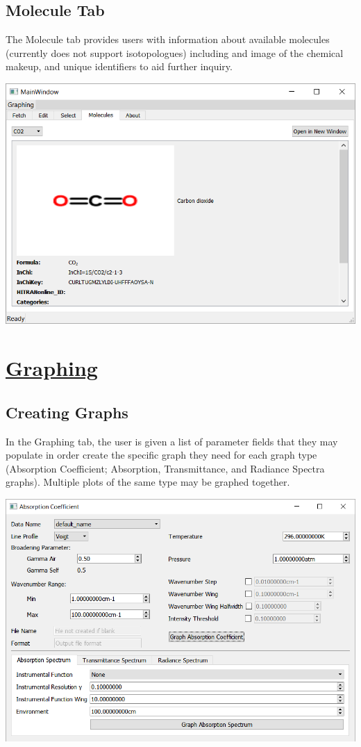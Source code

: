 \documentclass[a0,landscape]{a0poster}
\begin{document}
\begin{multicols}{3}
\subsection*{Molecule Tab}
The Molecule tab provides users with information about available molecules (currently does not support isotopologues) including and image of the chemical makeup, and unique identifiers to aid further inquiry.
\begin{center}
\includegraphics[scale = 1.5]{MainWindow_Molecules.png}
\end{center}

\section*{\underline{Graphing}}
\subsection*{Creating Graphs}
In the Graphing tab, the user is given a list of parameter fields that they may populate in order create the specific graph they need for each graph type (Absorption Coefficient; Absorption, Transmittance, and Radiance Spectra graphs). Multiple plots of the same type may be graphed together.
\begin{center}
\includegraphics[scale = 1.5]{GraphingWindow.png}
\end{center}
\vfill\null
\columnbreak

\end{multicols}
\end{document}
